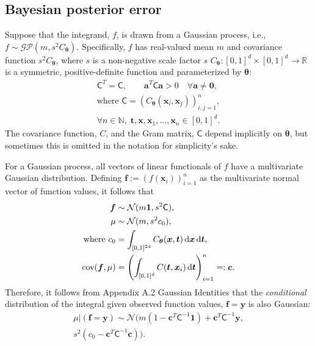 \documentclass[twocolumn]{svjour3}          %
\newcommand{\bm}[1]{\boldsymbol{#1}}
\newcommand{\dif}[1]{\text{d}{#1}}
\newcommand{\D}[1]{\text{d}{#1}}
\newcommand{\vtheta}{{\bm{\theta}}}
\newcommand{\va}{\bm{a}}
\newcommand{\vc}{\bm{c}}
\newcommand{\vf}{\bm{f}}
\newcommand{\vt}{\bm{t}}
\newcommand{\vx}{\bm{x}}
\newcommand{\vy}{\bm{y}}
\newcommand{\vzero}{\bm{0}}
\newcommand{\vone}{\bm{1}}
\newcommand{\mC}{\mathsf{C}}
\newcommand{\cov}{{\textup{cov}}}
\newcommand{\calN}{\mathcal{N}}
\begin{document}
\subsection{Bayesian posterior error}
\label{sec:BayesPostErr}

Suppose that the integrand, $f$, is drawn from a Gaussian process, i.e., $f \sim \mathcal{GP}(m,s^2 C_\vtheta)$.  Specifically, $f$ has real-valued mean $m$ and covariance function $s^2C_\vtheta$, where $s$ is a non-negative scale factor $s$ $C_\vtheta: [0,1]^d \times [0,1]^d \to \mathbb{R} $ is a symmetric, positive-definite function and parameterized by $\vtheta$:
\begin{multline} \label{FJH:eq:CondPosDef}
\mC^T = \mC,  \qquad \va^T \mC \va > 0 \quad  \forall \va \ne \vzero, 
\\ \text{where } \mC = \left(  C_\vtheta(\vx_i,\vx_j)  \right)_{i,j=1}^n,\\
\forall n\in \mathbb{N}, \; \vt, \vx, \vx_1, \ldots, \vx_n \in [0,1]^d.
\end{multline}
The covariance function, $C$, and the Gram matrix, $\mC$ depend implicitly on $\vtheta$, but sometimes this is omitted in the notation for simplicity's sake.

For a Gaussian process, all vectors of linear functionals of $f$ have a multivariate Gaussian distribution. Defining  $\vf  := \left( f(\vx_i)\right)_{i=1}^n$ as the multivariate normal vector of function values, it follows that 
\begin{subequations}
\begin{align}
\label{eqn:fGaussDist}
\vf  & \sim \calN(m \vone, s^2 \mC), \\
\mu & \sim \calN(m, s^2 c_0), 
\\
\text{where }
c_0 &= \int_{[0,1]^{2d}} C_\vtheta(\vx,\vt) \, \dif{\vx} \, \dif{\vt}, \\
\cov(\vf, \mu) &= \left(  \int_{[0,1]^d} C(\vt,\vx_i) \, \D \vt \right)_{i=1}^n  =: \vc.
\end{align}
\end{subequations}
Therefore,  it follows from \cite{RasWil06a} Appendix A.2 Gaussian Identities that the \emph{conditional} distribution of the integral given observed function values, $\vf = \vy$ is also Gaussian:
\begin{multline} \label{eqn:condInteg}
\mu | (\vf = \vy) \sim \calN \bigl(m (1 - \vc^T \mC^{-1} \vone)  + \vc^T \mC^{-1} \vy, 
\\
s^2(c_0  -\vc ^T \mC^{-1} \vc) \bigr).
\end{multline}
\end{document}
